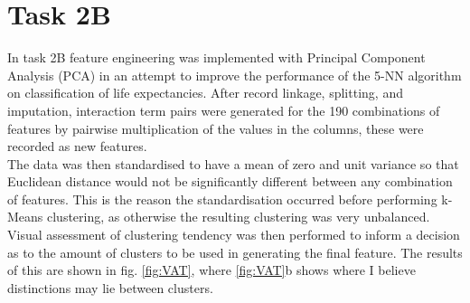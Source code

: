 \documentclass{article}
\begin{document}
\section*{Task 2B}
In task 2B feature engineering was implemented with Principal Component Analysis (PCA) in an attempt to improve the performance of the 5-NN algorithm on classification of life expectancies. After record linkage, splitting, and imputation, interaction term pairs were generated for the 190 combinations of features by pairwise multiplication of the values in the columns, these were recorded as new features.\\[2mm]
The data was then standardised to have a mean of zero and unit variance so that Euclidean distance would not be significantly different between any combination of features. This is the reason the standardisation occurred before performing k-Means clustering, as otherwise the resulting clustering was very unbalanced.\\[2mm]
Visual assessment of clustering tendency was then performed to inform a decision as to the amount of clusters to be used in generating the final feature. The results of this are shown in fig. \ref{fig:VAT}, where \ref{fig:VAT}b shows where I believe distinctions may lie between clusters. 
\end{document}
